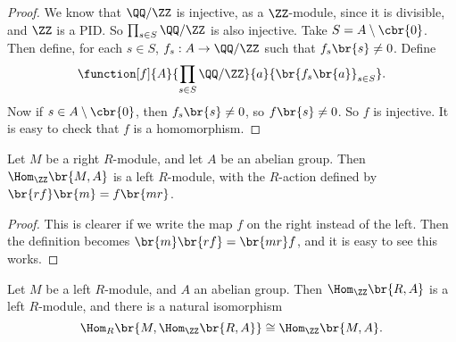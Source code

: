 \begin{proof}
We know that $ \QQ / \ZZ $ is injective, as a $ \ZZ $-module, since it is divisible, and $ \ZZ $ is a PID. So $ \prod_{s \in S} \QQ / \ZZ $ is also injective. Take $ S = A \setminus \cbr{0} $. Then define, for each $ s \in S $, $ f_s : A \to \QQ / \ZZ $ such that $ f_s\br{s} \ne 0 $. Define
$$ \function[f]{A}{\prod_{s \in S} \QQ / \ZZ}{a}{\br{f_s\br{a}}_{s \in S}}. $$
Now if $ s \in A \setminus \cbr{0} $, then $ f_s\br{s} \ne 0 $, so $ f\br{s} \ne 0 $. So $ f $ is injective. It is easy to check that $ f $ is a homomorphism.
\end{proof}

\begin{proposition}
Let $ M $ be a right $ R $-module, and let $ A $ be an abelian group. Then $ \Hom_\ZZ\br{M, A} $ is a left $ R $-module, with the $ R $-action defined by $ \br{rf}\br{m} = f\br{mr} $.
\end{proposition}

\begin{proof}
This is clearer if we write the map $ f $ on the right instead of the left. Then the definition becomes $ \br{m}\br{rf} = \br{mr}f $, and it is easy to see this works.
\end{proof}

\begin{proposition}
Let $ M $ be a left $ R $-module, and $ A $ an abelian group. Then $ \Hom_\ZZ\br{R, A} $ is a left $ R $-module, and there is a natural isomorphism
$$ \Hom_R\br{M, \Hom_\ZZ\br{R, A}} \cong \Hom_\ZZ\br{M, A}. $$
\end{proposition}

